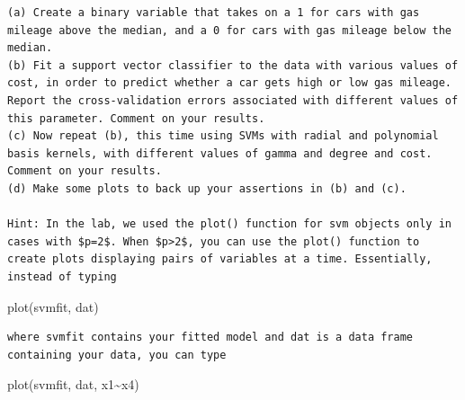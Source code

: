 \documentclass[10pt]{article}
\begin{document}
\begin{verbatim}
(a) Create a binary variable that takes on a 1 for cars with gas mileage above the median, and a 0 for cars with gas mileage below the median.
(b) Fit a support vector classifier to the data with various values of cost, in order to predict whether a car gets high or low gas mileage. Report the cross-validation errors associated with different values of this parameter. Comment on your results.
(c) Now repeat (b), this time using SVMs with radial and polynomial basis kernels, with different values of gamma and degree and cost. Comment on your results.
(d) Make some plots to back up your assertions in (b) and (c).

Hint: In the lab, we used the plot() function for svm objects only in cases with $p=2$. When $p>2$, you can use the plot() function to create plots displaying pairs of variables at a time. Essentially, instead of typing
\end{verbatim}

\begin{displayquote}
plot(svmfit, dat)
\end{displayquote}

\begin{verbatim}
where svmfit contains your fitted model and dat is a data frame containing your data, you can type
\end{verbatim}

\begin{displayquote}
plot(svmfit, dat, x1\~{}x4)
\end{displayquote}
\end{document}
